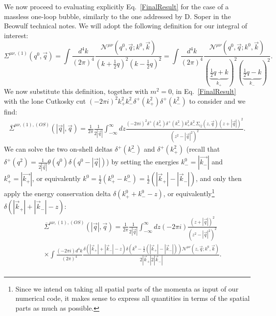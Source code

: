 \documentclass[11pt]{article}
\begin{document}
We now proceed to evaluating explicitly Eq.~\ref{FinalResult} for the case of a massless one-loop bubble, similarly to the one addressed by D. Soper in the Beowulf technical notes. We will adopt the following definition for our integral of interest:
\begin{equation}
\Sigma^{\mu\nu,(1)}(q^0, \vec{q}) =\int \frac{d^4 k}{(2\pi)^4}  \frac{ \mathcal{N}^{\mu\nu} \left(  q^0, \vec{q} ; k^0, \vec{k} \right) } {(k+\frac{1}{2}q)^2(k-\frac{1}{2}q)^2} 
= \int \frac{d^4 k}{(2\pi)^4} \frac{ \mathcal{N}^{\mu\nu} \left(  q^0, \vec{q} ; k^0, \vec{k} \right) } {(\underbrace{\frac{1}{2}q+k}_{k_{+}})^2(\underbrace{\frac{1}{2}q-k}_{k_{-}})^2}.
\end{equation}
We now substitute this definition, together with $m^2=0$, in Eq.~\ref{FinalResult} with the lone Cutkosky cut $(-2\pi i)^2 k_{+}^2 k_{-}^2 \delta^+\left(k_{+}^2 \right) \delta^+\left(k_{-}^2\right)$ to consider and we find:
\begin{eqnarray}
\overline{\Sigma}^{\mu\nu,(1),(OS)}(|\vec{q}|, \vec{q}) = \frac{ 1 }{2\pi } \frac{1}{2 |\vec{q}|} 
\int_{-\infty}^\infty dz \frac{ 
(-2\pi i)^2 \delta^+\left(k_{+}^2\right) \delta^+\left(k_{-}^2\right) k_{+}^2 k_{-}^2 \Sigma_{ij}(z, \vec{q})  \left( z + |\vec{q}|\right)^2
}{( z^2 - |\vec{q}|^2)^2 }.
\end{eqnarray}
We can solve the two on-shell deltas $\delta^+\left(k_{-}^2\right)$ and $\delta^+\left(k_{+}^2\right)$ (recall that $\delta^+(q^2)=\frac{1}{2 |\vec{q}|}\theta(q^0)\delta(q^0-|\vec{q}|)$) by setting the energies $k_{-}^0=|\vec{k_{-}}|$ and $k_{+}^0=|\vec{k_{+}}|$, or equivalently $k^0=\frac{1}{2}(k_{+}^0-k_{-}^0)=\frac{1}{2}(|\vec{k}_{+}|-|\vec{k}_{-}|)$, and only then apply the energy conservation delta $\delta\left(k_{+}^0+k_{-}^0-z\right)$, or equivalently\footnote{Since we intend on taking all spatial parts of the momenta as input of our numerical code, it makes sense to express all quantities in terms of the spatial parts as much as possible.} $\delta (|\vec{k}_{+}|+|\vec{k}_{-}|-z )$:
\begin{eqnarray}
&&\overline{\Sigma}^{\mu\nu,(1),(OS)}(|\vec{q}|, \vec{q}) = \frac{ 1 }{2\pi } \frac{1}{2 |\vec{q}|} 
\int_{-\infty}^\infty dz (-2\pi i) \frac{ 
\left( z + |\vec{q}|\right)^2
}{( z^2 - |\vec{q}|^2)^2 } \nonumber\\
&&\times
 \int \frac{(-2\pi i) d^4 k}{(2\pi)^4} \frac{ \delta\left(|\vec{k}_{+}|+|\vec{k}_{-}|-z\right) \delta \left(k^0 - \frac{1}{2}(|\vec{k}_{+}|-|\vec{k}_{-}|)\right) \mathcal{N}^{\mu\nu} \left(  z, \vec{q} ; k^0, \vec{k} \right) } {2|\vec{k}_{+}|2|\vec{k}_{-}|}.\nonumber\\
 \label{CutkoskyInserted}
\end{eqnarray}
\end{document}
